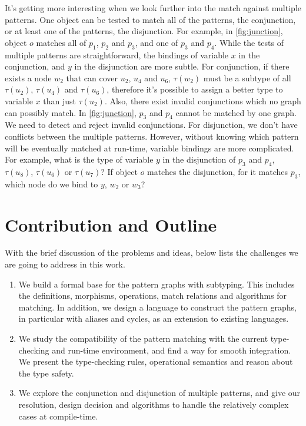 It's getting more interesting when we look further into the match against multiple patterns.
One object can be tested to match all of the patterns, the conjunction, or at least one of the patterns, the disjunction.
For example, in \autoref{fig:junction}, object $o$ matches all of $p_1$, $p_2$ and $p_3$, and one of $p_3$ and $p_4$.
While the tests of multiple patterns are straightforward,
the bindings of variable $x$ in the conjunction, and $y$ in the disjunction are more subtle.
For conjunction, if there exists a node $w_2$ that can cover $u_2$, $u_4$ and $u_6$, $\tau(w_2)$ must be a subtype of all $\tau(u_2)$, $\tau(u_4)$ and $\tau(u_6)$,
therefore it's possible to assign a better type to variable $x$ than just $\tau(u_2)$.
Also, there exist invalid conjunctions which no graph can possibly match.
In \autoref{fig:junction}, $p_3$ and $p_4$ cannot be matched by one graph. We need to detect and reject invalid conjunctions.
For disjunction, we don't have conflicts between the multiple patterns.
However, without knowing which pattern will be eventually matched at run-time, variable bindings are more complicated.
For example, what is the type of variable $y$ in the disjunction of $p_3$ and $p_4$, $\tau(u_8)$, $\tau(u_6)$ or $\tau(u_7)$?
If object $o$ matches the disjunction, for it matches $p_3$, which node do we bind to $y$, $w_2$ or $w_3$?

\section{Contribution and Outline}
With the brief discussion of the problems and ideas, below lists the challenges we are going to address in this work.
\begin{enumerate}
\item
We build a formal base for the pattern graphs with subtyping.
This includes the definitions, morphisms, operations, match relations and algorithms for matching.
In addition, we design a language to construct the pattern graphs, in particular with aliases and cycles,
as an extension to existing {\OO} languages.

\item
We study the compatibility of the pattern matching with the current type-checking and run-time environment,
and find a way for smooth integration.
We present the type-checking rules, operational semantics and reason about the type safety.

\item
We explore the conjunction and disjunction of multiple patterns,
and give our resolution, design decision and algorithms to handle the relatively complex cases at compile-time.
\end{enumerate}

